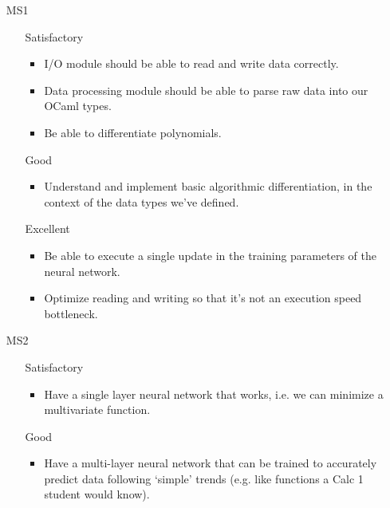 \documentclass{article}
\begin{document}
\begin{itemize}

\item[MS1]
	\begin{itemize}[leftmargin=2cm]
	
	\item[Satisfactory]
		\begin{itemize}
		\item I/O module should be able to read and write data correctly.
		\item Data processing module should be able to parse raw data into our OCaml types.
		\item Be able to differentiate polynomials.
		\end{itemize}

	\item[Good]
		\begin{itemize}
		\item Understand and implement basic algorithmic differentiation, in the context of the data types we've defined.
		\end{itemize}

	\item[Excellent]
		\begin{itemize}
		\item Be able to execute a single update in the training parameters of the neural network.
		\item Optimize reading and writing so that it's not an execution speed bottleneck.
		\end{itemize}
	
	\end{itemize}

\item[MS2]
	\begin{itemize}[leftmargin=2cm]
	
	\item[Satisfactory]
		\begin{itemize}
		\item Have a single layer neural network that works, i.e. we can minimize a multivariate function.
		\end{itemize}

	\item[Good]
		\begin{itemize}
		\item Have a multi-layer neural network that can be trained to accurately predict data following `simple' trends (e.g. like functions a Calc 1 student would know).
		\end{itemize}


\end{itemize}
\end{itemize}
\end{document}
